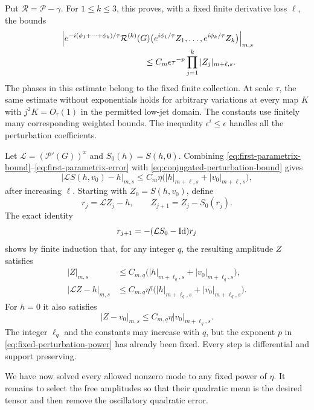Put $\mathcal R=\mathcal P-\gamma$. For $1\leq k\leq3$, this proves, with a
fixed finite derivative loss $\ell$, the bounds
\begin{align}
 &\left|e^{-i(\phi_1+\cdots+\phi_k)/\tau}
 \mathcal R^{(k)}(G)
 \bigl(e^{i\phi_1/\tau}Z_1,\ldots,e^{i\phi_k/\tau}Z_k\bigr)
 \right|_{m,s}
 \notag\\[-1mm]
 &\hspace{35mm}\leq
 C_m\epsilon\tau^{-p}\prod_{j=1}^k|Z_j|_{m+\ell,s}.
 \label{eq:conjugated-perturbation-bound}
\end{align}
The phases in this estimate belong to the fixed finite collection. At scale
$\tau$, the same estimate without exponentials holds for arbitrary variations
at every map $K$ with $j^2K=O_\tau(1)$ in the permitted low-jet domain.
The constants use finitely many corresponding weighted bounds. The inequality
$\epsilon^i\leq\epsilon$ handles all the perturbation coefficients.

Let $\mathcal L=(\mathcal P'(G))^x$ and $S_0(h)=S(h,0)$. Combining
\eqref{eq:first-parametrix-bound}--\eqref{eq:first-parametrix-error} with
\eqref{eq:conjugated-perturbation-bound} gives
\[
 |\mathcal L S(h,v_0)-h|_{m,s}
 \leq C_m\eta\bigl(|h|_{m+\ell,s}+|v_0|_{m+\ell,s}\bigr),
\]
after increasing $\ell$. Starting with $Z_0=S(h,v_0)$, define
\[
 r_j=\mathcal LZ_j-h,\qquad Z_{j+1}=Z_j-S_0(r_j).
\]
The exact identity
\[
 r_{j+1}=-(\mathcal L S_0-\operatorname{Id})r_j
\]
shows by finite induction that, for any integer $q$, the resulting amplitude
$Z$ satisfies
\begin{align}
 |Z|_{m,s}&\leq C_{m,q}
       \bigl(|h|_{m+\ell_q,s}+|v_0|_{m+\ell_q,s}\bigr),
 \label{eq:finite-mode-bound}\\
 |\mathcal LZ-h|_{m,s}&\leq C_{m,q}\eta^q
       \bigl(|h|_{m+\ell_q,s}+|v_0|_{m+\ell_q,s}\bigr).
 \label{eq:finite-mode-error}
\end{align}
For $h=0$ it also satisfies
\begin{equation}\label{eq:finite-free-mode}
 |Z-v_0|_{m,s}\leq C_{m,q}\eta|v_0|_{m+\ell_q,s}.
\end{equation}
The integer $\ell_q$ and the constants may increase with $q$, but the exponent
$p$ in \eqref{eq:fixed-perturbation-power} has already been fixed. Every step is
differential and support preserving.

We have now solved every allowed nonzero mode to any fixed power of $\eta$.
It remains to select the free amplitudes so that their quadratic mean is the
desired tensor and then remove the oscillatory quadratic error.


